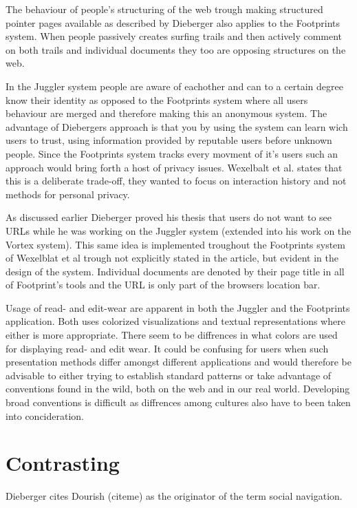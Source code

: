 \documentclass[12pt,a4paper]{article}
\begin{document}
The behaviour of people's structuring of the web trough making structured
pointer pages available as described by Dieberger also applies to the
Footprints system. When people passively creates surfing trails and then
actively comment on both trails and individual documents they too are opposing
structures on the web.

In the Juggler system people are aware of eachother and can to a certain
degree know their identity as opposed to the Footprints system where all users
behaviour are merged and therefore making this an anonymous system. The
advantage of Diebergers approach is that you by using the system can learn
wich users to trust, using information provided by reputable users
before unknown people. Since the Footprints system tracks every movment of
it's users such an approach would bring forth a host of privacy issues.
Wexelbalt et al. states that this is a deliberate trade-off, they wanted to
focus on interaction history and not methods for personal privacy.

As discussed earlier Dieberger proved his thesis that users do not want to see
URLs while he was working on the Juggler system (extended into his work on the
Vortex system). This same idea is implemented
troughout the Footprints system of Wexelblat et al
trough not explicitly stated in the article, but evident in the design
of the system. Individual documents are denoted by their page title in all of
Footprint's tools and the URL is only part of the browsers location bar.

Usage of read- and edit-wear are apparent in both the Juggler and the
Footprints application. Both uses colorized visualizations and textual
representations where either is more appropriate. There seem to be diffrences
in what colors are used for displaying read- and edit wear. It could be
confusing for users when such presentation methods differ amongst different
applications and would therefore be advisable to either trying to establish
standard patterns or take advantage of conventions found in the wild, both on
the web and in our real world. Developing broad conventions is difficult as
diffrences among cultures also have to been taken into concideration.

\section{Contrasting}

Dieberger cites Dourish (citeme) as the originator of the term social
navigation.
\end{document}

